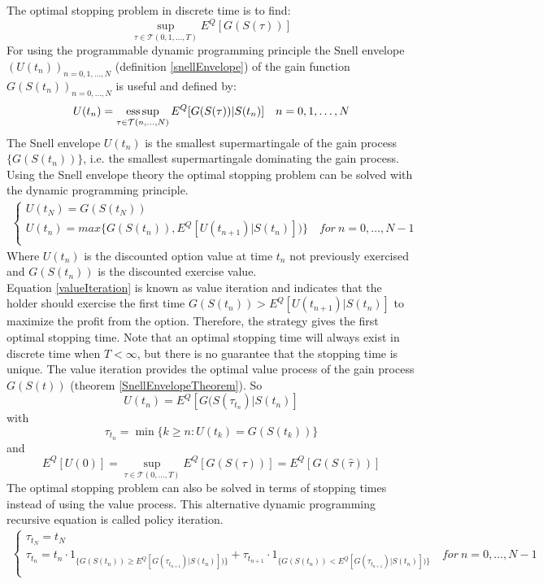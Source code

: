 The optimal stopping problem in discrete time is to find:
\begin{equation*}\label{Bermudanstop1}
\sup_{\tau \in \mathcal{T}(0,1,\ldots,T)} E^Q[G(S(\tau))]
\end{equation*}
For using the programmable dynamic programming principle the Snell envelope $(U(t_{n}))_{n=0,1,\ldots, N}$ (definition \ref{snellEnvelope}) of the gain function $G(S(t_n))_{n=0,\ldots,N}$ is useful and defined by:
$$U(t_n)=\operatorname*{ess\,sup}_{\tau \in \mathcal{T}(n,\ldots, N)} E^Q[G(S(\tau))|S(t_n)] \quad n=0,1, \ldots, N$$
The Snell envelope $U(t_n)$ is the smallest supermartingale of the gain process $\{G(S(t_n))\}$, i.e. the smallest supermartingale dominating the gain process. Using the Snell envelope theory the optimal stopping problem can be solved with the dynamic programming principle.
\begin{equation}\label{valueIteration}
\begin{split}
\begin{cases}
          U(t_{N}) = G(S(t_N))\\
          U(t_n) = max\{ G(S(t_n)), E^Q[U(t_{n+1})|S(t_n)])\} \quad for \ n={0,\ldots,N-1} \\ 
\end{cases}
\end{split}
\end{equation}
Where $U(t_n)$ is the discounted option value at time $t_n$ not previously exercised and $G(S(t_n))$ is the discounted exercise value.\\

Equation \eqref{valueIteration} is known as value iteration and indicates that the holder should exercise the first time $G(S(t_n))> E^Q[U(t_{n+1})|S(t_n)]$ to maximize the profit from the option. Therefore, the strategy gives the first optimal stopping time. Note that an optimal stopping time will always exist in discrete time when $T<\infty$, but there is no guarantee that the stopping time is unique. The value iteration provides the optimal value process of the gain process $G(S(t))$ (theorem \ref{SnellEnvelopeTheorem}). So 
$$U(t_n)=E^Q[G(S(\tau_{t_n})|S(t_n)]$$ with 
$$\tau_{t_n}=\min \{ k \geq n : U(t_k) = G(S(t_k)) \}$$ and 
$$E^Q[U(0)]= \sup_{\tau \in \mathcal{T}(0,\ldots, T)} E^Q[G(S(\tau))]=E^Q[G(S(\hat{\tau}))]$$ 
The optimal stopping problem can also be solved in terms of stopping times instead of using the value process. This alternative dynamic programming recursive equation is called policy iteration.
\begin{equation*}\label{policyIteration}
\begin{split}
\begin{cases}
          \tau_{t_N} = t_N\\
          \tau_{t_n} = t_n \cdot 1_{\{G(S(t_n)) \geq E^Q[G(\tau_{t_{n+1}})|S(t_n)])\}} + \tau_{t_{n+1}} \cdot 1_{\{G(S(t_n)) < E^Q[G(\tau_{t_{n+1}})|S(t_n)])\}} \quad for \ n={0,\ldots,N-1} \\ 
\end{cases}
\end{split}
\end{equation*}

